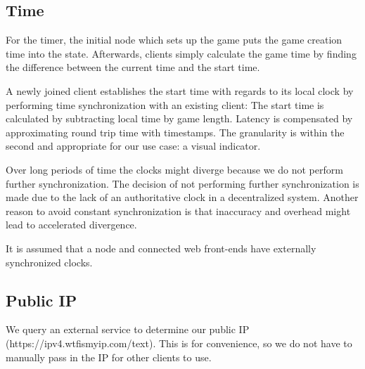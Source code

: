 \documentclass[twocolumn]{article}
\begin{document}
\subsection{Time}
For the timer, the initial node which sets up the game puts the game creation time into the state. Afterwards, clients simply calculate the game time by finding the difference between the current time and the start time.

A newly joined client establishes the start time with regards to its local clock by performing time synchronization with an existing client: The start time is calculated by subtracting local time by game length. Latency is compensated by approximating round trip time with timestamps. The granularity is within the second and appropriate for our use case: a visual indicator.

Over long periods of time the clocks might diverge because we do not perform further synchronization. The decision of not performing further synchronization is made due to the lack of an authoritative clock in a decentralized system. Another reason to avoid constant synchronization is that inaccuracy and overhead might lead to accelerated divergence. 

It is assumed that a node and connected web front-ends have externally synchronized clocks.


\subsection{Public IP}
We query an external service to determine our public IP (https://ipv4.wtfismyip.com/text). This is for convenience, so we do not have to manually pass in the IP for other clients to use.
\end{document}
